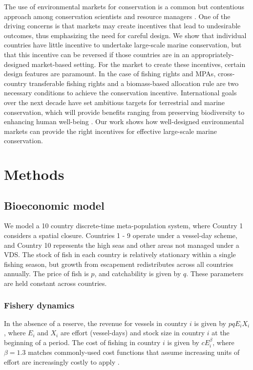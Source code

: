 \documentclass[12pt]{article}
\begin{document}
The use of environmental markets for conservation is a common but contentious approach among conservation scientists and resource managers \cite{sandbrook_2019}. One of the driving concerns is that markets may create incentives that lead to undesirable outcomes, thus emphasizing the need for careful design. We show that individual countries have little incentive to undertake large-scale marine conservation, but that this incentive can be reversed if those countries are in an appropriately-designed market-based setting. For the market to create these incentives, certain design features are paramount. In the case of fishing rights and MPAs, cross-country transferable fishing rights and a biomass-based allocation rule are two necessary conditions to achieve the conservation incentive. International goals over the next decade have set ambitious targets for terrestrial and marine conservation, which will provide benefits ranging from preserving biodiversity to enhancing human well-being \cite{oleary_2016,dinerstein_2019,roberts_2017,ban_2019}. Our work shows how well-designed environmental markets can provide the right incentives for effective large-scale marine conservation.

\clearpage

\section{Methods}

\subsection{Bioeconomic model}

We model a 10 country discrete-time meta-population system, where Country 1 considers a spatial closure. Countries 1 - 9 operate under a vessel-day scheme, and Country 10 represents the high seas and other areas not managed under a VDS. The stock of fish in each country is relatively stationary within a single fishing season, but  growth from escapement redistributes across all countries annually. The price of fish is $p$, and catchability is given by $q$. These parameters are held constant across countries.

\subsubsection{Fishery dynamics}

In the absence of a reserve, the revenue for vessels in country $i$ is given by $pqE_iX_i$, where $E_i$ and $X_i$ are effort (vessel-days) and stock size in country $i$ at the beginning of a period. The cost of fishing in country $i$ is given by $cE_i^\beta$, where $\beta = 1.3$ matches commonly-used cost functions that assume increasing units of effort are increasingly costly to apply \cite{costello_2016}.
\end{document}
